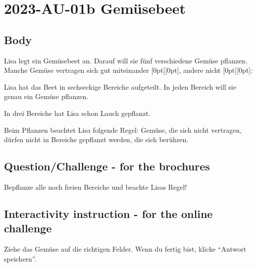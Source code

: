 \documentclass[a4paper,11pt]{report}
\newcommand{\taskGraphicsFolder}{..}
\begin{document}
\section*{\centering{} 2023-AU-01b Gemüsebeet}


\subsection*{Body}

Lisa legt ein Gemüsebeet an. Darauf will sie fünf verschiedene Gemüse pflanzen. Manche Gemüse vertragen sich gut miteinander \raisebox{-0.5ex}[0pt][0pt]{}, andere nicht \raisebox{-0.5ex}[0pt][0pt]{}:

{\centering%
\par}

Lisa hat das Beet in sechseckige Bereiche aufgeteilt. In jeden Bereich will sie genau ein Gemüse pflanzen.

In drei Bereiche hat Lisa schon Lauch \raisebox{-0.5ex}{} gepflanzt.

{\centering%
\par}

Beim Pflanzen beachtet Lisa folgende Regel: Gemüse, die sich nicht vertragen, dürfen nicht in Bereiche gepflanzt werden, die sich berühren.

{\em


\subsection*{Question/Challenge - for the brochures}

Bepflanze alle noch freien Bereiche und beachte Lisas Regel!

}


\subsection*{Interactivity instruction - for the online challenge}

Ziehe das Gemüse auf die richtigen Felder. Wenn du fertig bist, klicke \enquote{Antwort speichern}.

\begingroup
\renewcommand{\arraystretch}{1.5}
\end{document}
